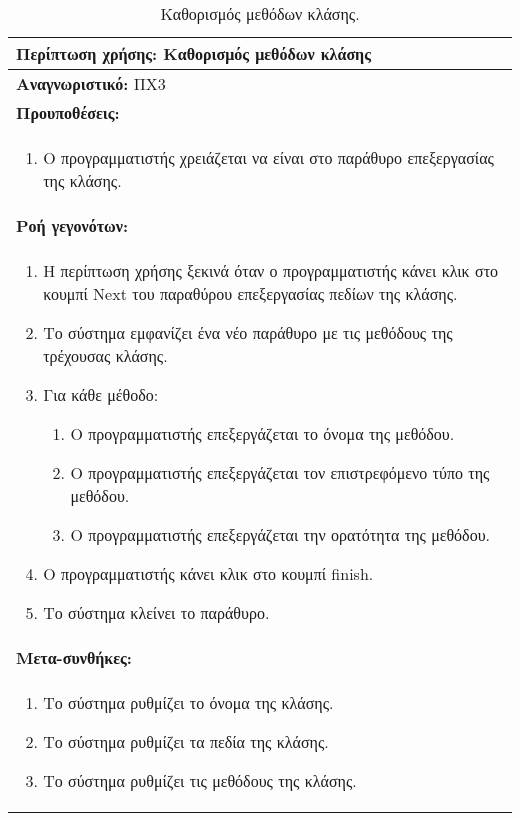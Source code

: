 \begin{table}[H]
	\hspace*{-0.2cm}
    \centering
    \scriptsize
	\begin{tabular}{|p{10cm}|}
	\hline
		\textbf{Περίπτωση χρήσης:} Καθορισμός μεθόδων κλάσης \\
	\hline
		\textbf{Αναγνωριστικό:} ΠΧ3 \\
	\hline	
		\textbf{Προυποθέσεις:} \\
		\begin{enumerate}
		 \item Ο προγραμματιστής χρειάζεται να είναι στο παράθυρο επεξεργασίας της κλάσης.
		\end{enumerate} \\
	\hline
		\textbf{Ροή γεγονότων:} \\
			\begin{enumerate}
		 \item Η περίπτωση χρήσης ξεκινά όταν ο προγραμματιστής κάνει κλικ στο κουμπί Next του παραθύρου επεξεργασίας πεδίων της κλάσης.
		 \item Το σύστημα εμφανίζει ένα νέο παράθυρο με τις μεθόδους της τρέχουσας κλάσης.
		 \item Για κάθε μέθοδο:\begin{enumerate}
						 		 \item Ο προγραμματιστής επεξεργάζεται το όνομα της μεθόδου.
								 \item Ο προγραμματιστής επεξεργάζεται τον επιστρεφόμενο τύπο της μεθόδου.
		 						  \item Ο προγραμματιστής επεξεργάζεται την ορατότητα της μεθόδου.
			 		 		  \end{enumerate}
 		 \item Ο προγραμματιστής κάνει κλικ στο κουμπί finish.
 		 \item Το σύστημα κλείνει το παράθυρο.
		\end{enumerate} \\
	\hline
		\textbf{Μετα-συνθήκες:} \\
		\begin{enumerate}
			\item Το σύστημα ρυθμίζει το όνομα της κλάσης.
			\item Το σύστημα ρυθμίζει τα πεδία της κλάσης.
			\item Το σύστημα ρυθμίζει τις μεθόδους της κλάσης.
		\end{enumerate} \\
	\hline
    \end{tabular}
    \caption{Καθορισμός μεθόδων κλάσης.}
    \label{tab:setClassMethodsUC}
\end{table}
